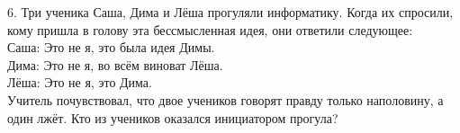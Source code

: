 6. Три ученика Саша, Дима и Лёша прогуляли информатику. Когда их спросили, кому пришла в голову эта бессмысленная идея, они ответили следующее:\\
Саша: Это не я, это была идея Димы.\\
Дима: Это не я, во всём виноват Лёша.\\
Лёша: Это не я, это Дима.\\
Учитель почувствовал, что двое учеников говорят правду только наполовину, а один лжёт. Кто из учеников оказался инициатором прогула?\\
